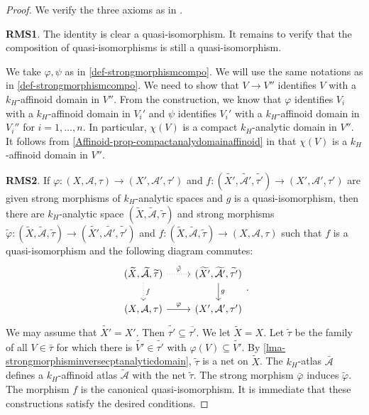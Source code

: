 \begin{proof}
    We verify the three axioms as in \cite[\href{https://stacks.math.columbia.edu/tag/04VC}{Tag 04VC}]{stacks-project}.

    \textbf{RMS1}. The identity is clear a quasi-isomorphism. It remains to verify that the composition of quasi-isomorphisms is still a quasi-isomorphism.

    We take $\varphi,\psi$ as in \cref{def-strongmorphismcompo}. We will use the same notations as in \cref{def-strongmorphismcompo}. We need to show that $V\rightarrow V''$ identifies $V$ with a $k_H$-affinoid domain in $V''$. From the construction, we know that $\varphi$ identifies $V_i$ with a $k_H$-affinoid domain in $V_i'$ and $\psi$ identifies $V_i'$ with a $k_H$-affinoid domain in $V_i''$ for $i=1,\ldots,n$. In particular, $\chi(V)$ is a compact $k_H$-analytic domain in $V''$. It follows from \cref{Affinoid-prop-compactanalydomainaffinoid} in  that $\chi(V)$ is a $k_H$-affinoid domain in $V''$.

    \textbf{RMS2}.
    If $\varphi:(X,\mathcal{A},\tau)\rightarrow (X',\mathcal{A}',\tau')$ and $f:(\widetilde{X'},\widetilde{\mathcal{A}'},\widetilde{\tau'})\rightarrow (X',\mathcal{A}',\tau')$ are given strong morphisms of $k_H$-analytic spaces and $g$ is a quasi-isomorphism, then there are $k_H$-analytic space $(\widetilde{X},\widetilde{\mathcal{A}},\widetilde{\tau})$ and strong morphisms $\tilde{\varphi}:(\widetilde{X},\widetilde{\mathcal{A}},\widetilde{\tau})\rightarrow (\widetilde{X'},\widetilde{\mathcal{A}'},\widetilde{\tau'})$ and $f:(\widetilde{X},\widetilde{\mathcal{A}},\widetilde{\tau})\rightarrow (X,\mathcal{A},\tau)$ such that $f$ is a quasi-isomorphism and the following diagram commutes:  
    \[
        \begin{tikzcd}
            {(\widetilde{X},\widetilde{\mathcal{A}},\widetilde{\tau})} \arrow[r, "\tilde{\varphi}", dotted] \arrow[d, "f", dotted] & {(\widetilde{X'},\widetilde{\mathcal{A}'},\widetilde{\tau'})} \arrow[d, "g"] \\
            {(X,\mathcal{A},\tau)} \arrow[r, "\varphi"]                                                                            & {(X',\mathcal{A}',\tau')}                                                   
        \end{tikzcd}.
    \]  
    We may assume that $\widetilde{X'}=X'$. Then $\widetilde{\tau'}\subseteq \overline{\tau'}$. We let $\tilde{X}=X$. Let $\tilde{\tau}$ be the family of all $V\in \bar{\tau}$ for which there is $\widetilde{V'}\in\widetilde{\tau'}$ with $\varphi(V)\subseteq \widetilde{V'}$. By \cref{lma-strongmorphisminversecptanalyticdomain}, $\tilde{\tau}$ is a net on $\tilde{X}$. The $k_H$-atlas $\bar{\mathcal{A}}$ defines a $k_H$-affinoid atlas $\tilde{\mathcal{A}}$ with the net $\tilde{\tau}$. The strong morphism $\bar{\varphi}$ induces $\tilde{\varphi}$. The morphism $f$ is the canonical quasi-isomorphism. It is immediate that these constructions satisfy the desired conditions.


\end{proof}
